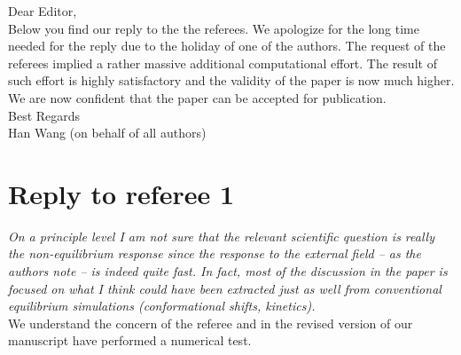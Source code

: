 \documentclass[]{revtex4-1}
\begin{document}
Dear Editor,\\

Below you find our reply to the the referees. We apologize for the long time needed for the reply due to the holiday of one of the authors.  The request of the referees implied a rather massive additional computational effort. The result of such effort is highly satisfactory and the validity of the paper is now much higher. We are now confident that the paper can be accepted for publication.\\

Best Regards\\


Han Wang (on behalf of all authors) 
\section*{Reply to referee 1}

\emph{On a principle level I am not sure that the relevant scientific
  question is really the non-equilibrium response since the response
  to the external field -- as the authors note -- is indeed quite
  fast. In fact, most of the discussion in the paper is focused on
  what I think could have been extracted just as well from
  conventional equilibrium simulations (conformational shifts,
  kinetics).}\\

We understand the concern of the referee and in the revised version of our manuscript have performed a numerical test.
\end{document}
